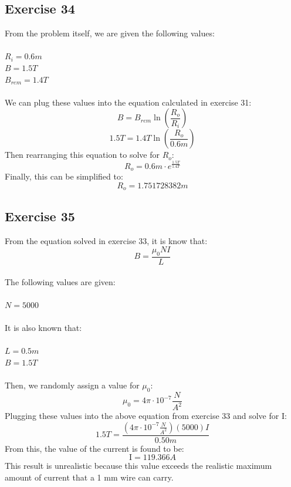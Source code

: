 \documentclass{article}
\begin{document}
\subsection{Exercise 34}
From the problem itself, we are given the following values:
\\
\\
$R_{i} =  0.6 m$
\\
$B =  1.5 T$
\\
$B_{\mathit{rem}} =  1.4 T$
\\
\\
We can plug these values into the equation  calculated in exercise 31:
\begin{equation}
    B = B_{\mathit{rem}} \ln \! \left(\frac{R_{o}}{R_{i}}\right)
\end{equation}
\begin{equation}
    1.5 T =  1.4 T \ln \! \left(\frac{R_{o}}{0.6m}\right)
\end{equation}
Then rearranging this equation to solve for $R_{o}$:
\begin{equation}
    R_{o} = 0.6 m \cdot e^{\frac{1.5T}{1.4T}}
\end{equation}
Finally, this can be simplified to:
\begin{equation}
    R_{o} =  1.751728382 m
\end{equation}

\subsection{Exercise 35}
From the equation solved in exercise 33, it is know that:
\begin{equation}
    B=\frac{\mu_{0} \mathit{NI}}{L}
\end{equation}
\\
The following values are given:
\\
\\
$N=5000$
\\
\\
It is also known that:
\\
\\
$L=0.5m$
\\
$B=1.5T$
\\
\\
Then, we randomly assign a value for $\mu_{0}$:
\begin{equation}
   \mu_{0}=4\pi\cdot \mathit{10}^{-7}\frac{N}{A^{2}}
\end{equation}
Plugging these values into the above equation from exercise 33 and solve for I:
\begin{equation}
    1.5T=\frac{\left(4\pi \cdot \mathit{10}^{-7}\frac{N}{A^{2}}\right)\left(5000\right)I}{ 0.50m}
\end{equation}
From this, the value of the current is found to be:
\begin{equation}
    \mathrm{I}  =  119.366 A
\end{equation}
This result is unrealistic because this value exceeds the realistic maximum amount of current that a 1 mm wire can carry. 
\end{document}
